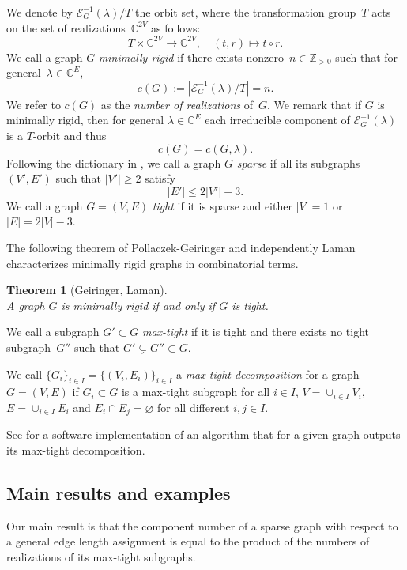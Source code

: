 \documentclass[12pt]{article}
\newtheorem{theoremext}{Theorem}
\theoremstyle{definition}
\newcommand{\df}[1]{{\it #1}}
\newcommand{\st}{such that }
\newcommand{\wrt}{with respect to }
\newcommand{\C}{{\mathbb{C}}}
\newcommand{\Z}{{\mathbb{Z}}}
\newcommand{\cE}{\mathcal{E}}
\begin{document}
We denote by $\cE_G^{-1}(\lambda)/T$ the orbit set, where
the transformation group~$T$ acts on
the set of realizations~$\C^{2V}$ as follows:
\[
T\times \C^{2V}\to \C^{2V},\quad (t,r)\mapsto t\circ r.
\]
We call a graph $G$ \df{minimally rigid} if there exists nonzero~$n\in\Z_{> 0}$
\st for general~$\lambda\in \C^E$,
\[
c(G):=|\cE_G^{-1}(\lambda)/T|=n.
\]
We refer to $c(G)$ as the \df{number of realizations} of~$G$.
We remark that if $G$ is minimally rigid, then for general $\lambda\in\C^E$
each irreducible component of $\cE_G^{-1}(\lambda)$ is a $T$-orbit and
thus
\[
c(G)=c(G,\lambda).
\]
Following the dictionary in \cite{2008}, we call a graph $G$ \df{sparse}
if all its subgraphs~$(V', E')$ \st $|V'|\geq 2$ satisfy
\[
|E'| \leq 2|V'| - 3.
\]
We call a graph $G=(V,E)$ \df{tight} if it is sparse and either $|V|=1$ or $|E|=2|V| - 3$.

The following theorem of Pollaczek-Geiringer \cite{1927} and independently Laman \cite{1970}
characterizes minimally rigid graphs in combinatorial terms.

\begin{theoremext}[Geiringer, Laman]
\label{thm:laman}
~\\
A graph $G$ is \df{minimally rigid} if and only if $G$ is tight.
\end{theoremext}

We call a subgraph $G'\subset G$ \df{max-tight} if it is tight and there exists
no tight subgraph~$G''$ \st $G'\subsetneq G''\subset G$.

We call $\{G_i\}_{i\in I}=\{(V_i,E_i)\}_{i\in I}$ a \df{max-tight decomposition} for a graph~$G=(V,E)$
if $G_i\subset G$ is a max-tight subgraph for all $i\in I$,
$V=\cup_{i\in I}V_i$, $E=\cup_{i\in I} E_i$
and $E_i\cap E_j=\varnothing$ for all different $i,j\in I$.

See \cite{2025pyrigi} for a
\href{https://pyrigi.github.io/PyRigi/userguide/api/graph.html#pyrigi.graph.Graph.rigid_components}{software implementation}
of an algorithm that for a given graph outputs its max-tight decomposition.

\subsection*{Main results and examples}

Our main result is that the component number of a sparse graph
\wrt a general edge length assignment
is equal to the product of the numbers of realizations of its max-tight subgraphs.
\end{document}
